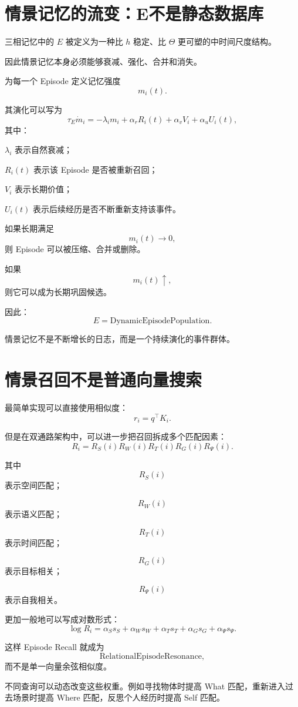 \section{情景记忆的流变：E不是静态数据库}

三相记忆中的 $E$ 被定义为一种比 $h$ 稳定、比 $\Theta$ 更可塑的中时间尺度结构。

因此情景记忆本身必须能够衰减、强化、合并和消失。

为每一个 Episode 定义记忆强度
\[
m_i(t).
\]

其演化可以写为
\[
\boxed{
\tau_E\dot m_i
=
-\lambda_i m_i
+
\alpha_r R_i(t)
+
\alpha_v V_i
+
\alpha_u U_i(t),
}
\]
其中：

$\lambda_i$ 表示自然衰减；

$R_i(t)$ 表示该 Episode 是否被重新召回；

$V_i$ 表示长期价值；

$U_i(t)$ 表示后续经历是否不断重新支持该事件。

如果长期满足
\[
m_i(t)\rightarrow0,
\]
则 Episode 可以被压缩、合并或删除。

如果
\[
m_i(t)\uparrow,
\]
则它可以成为长期巩固候选。

因此：
\[
\boxed{
E
=
\mathrm{DynamicEpisodePopulation}.
}
\]

情景记忆不是不断增长的日志，而是一个持续演化的事件群体。

\section{情景召回不是普通向量搜索}

最简单实现可以直接使用相似度：
\[
r_i=q^\top K_i.
\]

但是在双通路架构中，可以进一步把召回拆成多个匹配因素：
\[
\boxed{
R_i
=
R_S(i)
R_W(i)
R_T(i)
R_G(i)
R_\Psi(i).
}
\]

其中
\[
R_S(i)
\]
表示空间匹配；

\[
R_W(i)
\]
表示语义匹配；

\[
R_T(i)
\]
表示时间匹配；

\[
R_G(i)
\]
表示目标相关；

\[
R_\Psi(i)
\]
表示自我相关。

更加一般地可以写成对数形式：
\[
\log R_i
=
\alpha_S s_S
+
\alpha_W s_W
+
\alpha_T s_T
+
\alpha_G s_G
+
\alpha_\Psi s_\Psi.
\]

这样 Episode Recall 就成为
\[
\boxed{
\mathrm{RelationalEpisodeResonance},
}
\]
而不是单一向量余弦相似度。

不同查询可以动态改变这些权重。例如寻找物体时提高 What 匹配，重新进入过去场景时提高 Where 匹配，反思个人经历时提高 Self 匹配。

